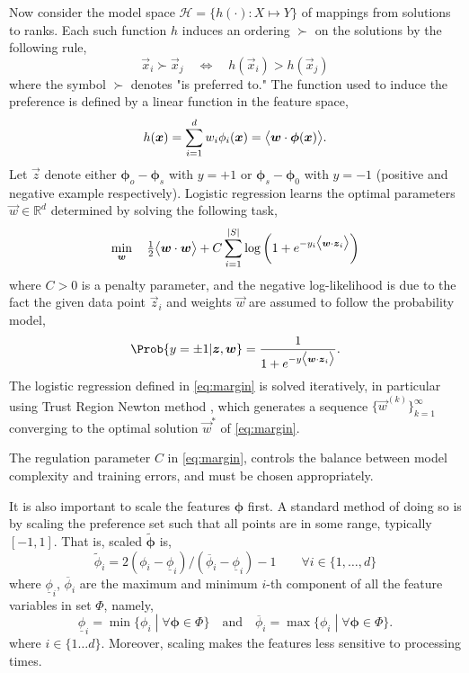 \documentclass[smallextended]{svjour3}
\renewcommand{\vphi}{\bm \phi}
\begin{document}
	Now consider the model space $\mathcal{H} = \{h(\cdot) : X \mapsto Y\}$ of mappings from solutions to ranks. Each such function $h$ induces an ordering $\succ$ on the solutions  by the following rule,
	\begin{equation}\label{eq:linear}
	\vec{x}_i \succ \vec{x}_j \quad \Leftrightarrow \quad h(\vec{x}_i) > h(\vec{x}_j)
	\end{equation}
	where the symbol $\succ$ denotes "is preferred to."  The function used to induce the preference is defined by a linear function in the feature space,
	\begin{equation}\label{eq:jssp:linweights}
	h(\vec{x})=\sum_{i=1}^d w_i\phi_i(\vec{x})=\inner{\vec{w}}{\vphi(\vec{x})}.
	\end{equation}
	Let $\vec{z}$ denote either $\vphi_o-\vphi_s$ with $y=+1$ or $\vphi_s-\vphi_0$ with $y=-1$ (positive and negative example respectively). Logistic regression learns the optimal parameters $\vec{w}\in\mathbb{R}^d$ determined by solving the following task, 
	\begin{equation}\label{eq:margin}
	\min_{\vec{w}}\quad \tfrac{1}{2}\inner{\vec{w}}{\vec{w}} + C \sum_{i=1}^{\abs{S}} \log\left(1 + e^{-y_i \inner{\vec{w}}{\vec{z}_i}}\right) 
	\end{equation}
	where $C > 0$ is a penalty parameter, and the negative log-likelihood is due to the fact the given data point $\vec{z}_i$ and weights $\vec{w}$ are assumed to follow the probability model,
	\begin{equation}\label{eq:prob}
	\Prob{y=\pm1|\vec{z},\vec{w}}=\frac{1}{1+e^{-y\inner{\vec{w}}{\vec{z}_i}}}.
	\end{equation}
	The logistic regression defined in \cref{eq:margin} is solved iteratively, in particular using Trust Region Newton method \cite{Lin08:newtontrustregion}, which generates a sequence $\{\vec{w}^{(k)}\}_{k=1}^\infty$ converging to the optimal solution $\vec{w}^*$ of \cref{eq:margin}.
	
	The regulation parameter $C$ in \cref{eq:margin}, controls the balance between model complexity and training errors, and must be chosen appropriately. 
	
	It is also important to scale the features $\vphi$ first. A standard method of doing so is by scaling the preference set such that all points are in some range, typically $[-1,1]$. That is, scaled $\tilde{\vphi}$ is,
	\begin{equation}\label{eq:scale}
	\tilde{\phi}_i = 2 (\phi_i - \underline{\phi}_i) / (\overline{\phi}_i - \underline{\phi}_i) - 1 
	\quad\quad \forall i\in\{1,\ldots,d\}
	\end{equation}
	where $\underline{\phi}_i$, $\overline{\phi}_i$ are the maximum and minimum $i$-th component of all the feature variables in set $\Phi$, namely,
	\begin{equation}
	\underline{\phi}_i=\min\{\phi_i\;|\;\forall\vphi\in \Phi\} \quad\textrm{and}\quad \overline{\phi}_i=\max\{\phi_i\;|\;\forall\vphi\in \Phi\}.
	\end{equation}
	where $i\in\{1\ldots d\}$. Moreover, scaling makes the features less sensitive to processing times. 
	
\end{document}
